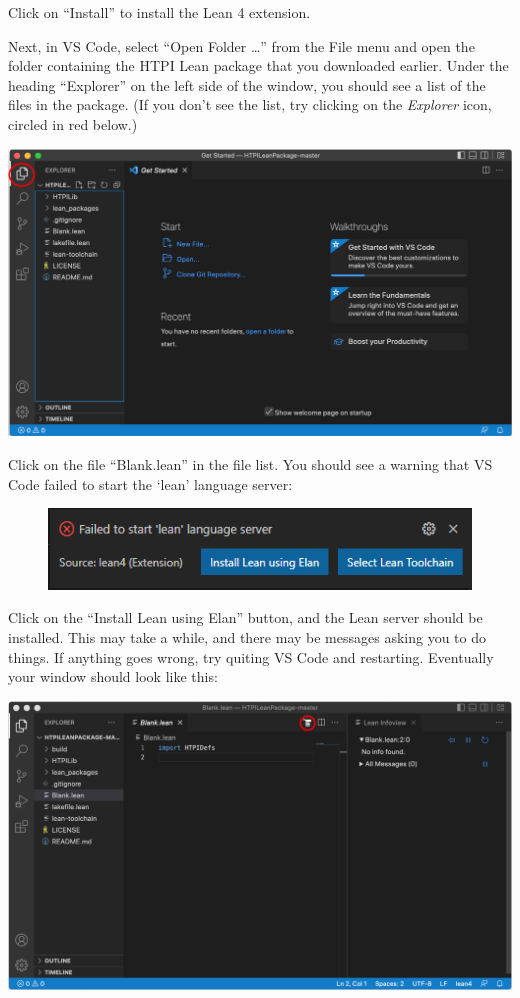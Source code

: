 \documentclass[
  letterpaper,
  DIV=11,
  numbers=noendperiod]{scrreprt}
\begin{document}
Click on ``Install'' to install the Lean 4 extension.

Next, in VS Code, select ``Open Folder \ldots{}'' from the File menu and
open the folder containing the HTPI Lean package that you downloaded
earlier. Under the heading ``Explorer'' on the left side of the window,
you should see a list of the files in the package. (If you don't see the
list, try clicking on the \emph{Explorer} icon, circled in red below.)

\includegraphics{./Images/OpenPackage.png}

Click on the file ``Blank.lean'' in the file list. You should see a
warning that VS Code failed to start the `lean' language server:

\begin{figure}

{\centering \includegraphics{./Images/Install-elan.png}

}

\end{figure}

Click on the ``Install Lean using Elan'' button, and the Lean server
should be installed. This may take a while, and there may be messages
asking you to do things. If anything goes wrong, try quiting VS Code and
restarting. Eventually your window should look like this:

\includegraphics{./Images/Ready.png}
\end{document}
